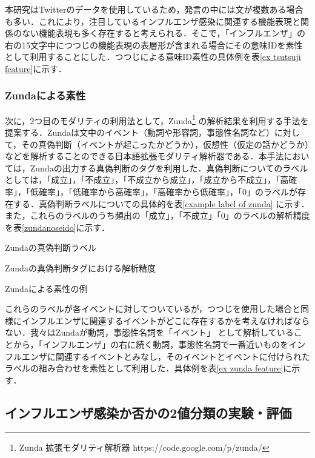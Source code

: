 \documentclass[japanese]{jnlp_1.4}
\begin{document}
本研究はTwitterのデータを使用しているため，発言の中には文が複数ある場合も多い．これにより，注目しているインフルエンザ感染に関連する機能表現と関係のない機能表現も多く存在すると考えられる．そこで，「インフルエンザ」の右の15文字中につつじの機能表現の表層形が含まれる場合にその意味IDを素性として利用することにした．つつじによる意味ID素性の具体例を表\ref{ex tsutsuji feature}に示す．


\subsubsection{Zundaによる素性}

次に，2つ目のモダリティの利用法として，Zunda\footnote{Zunda 拡張モダリティ解析器 https://code.google.com/p/zunda/} の解析結果を利用する手法を提案する．Zundaは文中のイベント（動詞や形容詞，事態性名詞など）に対して，その真偽判断（イベントが起こったかどうか），仮想性（仮定の話かどうか）などを解析することのできる日本語拡張モダリティ解析器である．本手法においては，Zundaの出力する真偽判断のタグを利用した．真偽判断についてのラベルとしては，「成立」，「不成立」，「不成立から成立」，「成立から不成立」，「高確率」，「低確率」，「低確率から高確率」，「高確率から低確率」，「0」のラベルが存在する．真偽判断ラベルについての具体的を表\ref{example label of zunda} に示す．また，これらのラベルのうち頻出の「成立」，「不成立」「0」のラベルの解析精度を表\ref{zundanoseido}に示す．

\begin{table}[b]
\caption{Zundaの真偽判断ラベル}
\label{example label of zunda}

\end{table}
\begin{table}[b]
\caption{Zundaの真偽判断タグにおける解析精度}
\label{zundanoseido}

\end{table}
\begin{table}[b]
\caption{Zundaによる素性の例}
\label{ex zunda feature}

\end{table}

これらのラベルが各イベントに対してついているが，つつじを使用した場合と同様にインフルエンザに関連するイベントがどこに存在するかを考えなければならない．我々はZundaが動詞，事態性名詞を「イベント」
として解析していることから，「インフルエンザ」の右に続く動詞，事態性名詞で一番近いものをインフルエンザに関連するイベントとみなし，そのイベントとイベントに付けられたラベルの組み合わせを素性として利用した．具体例を表\ref{ex zunda feature}に示す．


 \subsection{インフルエンザ感染か否かの2値分類の実験・評価}
\end{document}
